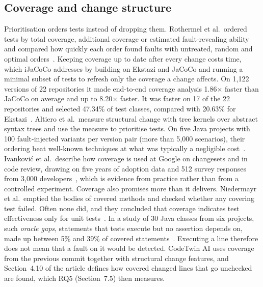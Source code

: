 \documentclass[11pt]{article}
\begin{document}
\subsection*{Coverage and change structure}
Prioritisation orders tests instead of dropping them. Rothermel et al.\ ordered tests by total coverage, additional coverage or estimated fault-revealing ability and compared how quickly each order found faults with untreated, random and optimal orders~\cite{rothermel2001prioritizing}. Keeping coverage up to date after every change costs time, which iJaCoCo addresses by building on Ekstazi and JaCoCo and running a minimal subset of tests to refresh only the coverage a change affects. On 1,122 versions of 22 repositories it made end-to-end coverage analysis 1.86$\times$ faster than JaCoCo on average and up to 8.20$\times$ faster. It was faster on 17 of the 22 repositories and selected 47.34\% of test classes, compared with 20.63\% for Ekstazi~\cite{wang2024ijacoco}. Altiero et al.\ measure structural change with tree kernels over abstract syntax trees and use the measure to prioritise tests. On five Java projects with 100 fault-injected variants per version pair (more than 5,000 scenarios), their ordering beat well-known techniques at what was typically a negligible cost~\cite{altiero2024treekernel}. Ivankovi\'c et al.\ describe how coverage is used at Google on changesets and in code review, drawing on five years of adoption data and 512 survey responses from 3,000 developers~\cite{ivankovic2019coverage}, which is evidence from practice rather than from a controlled experiment. Coverage also promises more than it delivers. Niedermayr et al.\ emptied the bodies of covered methods and checked whether any covering test failed. Often none did, and they concluded that coverage indicates test effectiveness only for unit tests~\cite{niedermayr2016will}. In a study of 30 Java classes from six projects, such \emph{oracle gaps}, statements that tests execute but no assertion depends on, made up between 5\% and 39\% of covered statements~\cite{maton2025oracle}. Executing a line therefore does not mean that a fault on it would be detected. CodeTwin AI uses coverage from the previous commit together with structural change features, and Section~4.10 of the article defines how covered changed lines that go unchecked are found, which RQ5 (Section~7.5) then measures.
\end{document}
